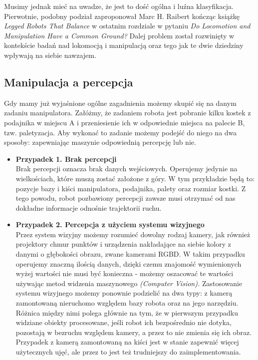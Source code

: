 \documentclass[12pt]{article}
\begin{document}
Musimy jednak mieć na uwadze, że jest to dość ogólna i luźna klasyfikacja. Pierwotnie, podobny podział zaproponował Marc H. Raibert kończąc książkę  \emph{Legged Robots That Balance} w ostatnim rozdziale w pytaniu \emph{Do Locomotion and Manipulation Have a Common Ground?} Dalej problem został rozwinięty w kontekście badań nad lokomocją i manipulacją oraz tego jak te dwie dziedziny wpływają na siebie nawzajem.

\subsection{Manipulacja a percepcja}
Gdy mamy już wyjaśnione ogólne zagadnienia możemy skupić się na danym zadaniu manipulatora. Załóżmy, że zadaniem robota jest pobranie kilku kostek z podajnika w miejscu A i przeniesienie ich w odpowiednie miejsca na palecie B, tzw. paletyzacja. Aby wykonać to zadanie możemy podejść do niego na dwa sposoby: zapewniając maszynie odpowiednią percepcję lub nie. 

\begin{itemize}
\item \textbf{Przypadek 1. Brak percepcji} \\
Brak percepcji oznacza brak danych wejściowych. Operujemy jedynie na wielkościach, które muszą zostać założone z góry. W tym przykładzie będą to: pozycje bazy i kiści manipulatora, podajnika, palety oraz rozmiar kostki. Z tego powodu, robot pozbawiony percepcji zawsze musi otrzymać od nas dokładne informacje odnośnie trajektorii ruchu.

\item \textbf{Przypadek 2. Percepcja z użyciem systemu wizyjnego} \\
Przez system wizyjny możemy rozumieć dowolny rodzaj kamery, jak również projektory chmur punktów i urządzenia nakładające na siebie kolory z danymi o głębokości obrazu, zwane kamerami RGBD. W takim przypadku operujemy znaczną ilością danych, dzięki czemu znajomość wymienionych wyżej wartości nie musi być konieczna - możemy oszacować te wartości używając metod widzenia maszynowego \emph{(Computer Vision).} Zastosowanie systemu wizyjnego możemy ponownie podzielić na dwa typy: z kamerą zamontowaną nieruchomo względem bazy robota oraz na jego narzędziu. Różnica między nimi polega głównie na tym, że w pierwszym przypadku widziane obiekty procesowane, jeśli robot ich bezpośrednio nie dotyka, pozostają w bezruchu względem kamery, a przez to nie zmienia się ich obraz. Przypadek z kamerą zamontowaną na kiści jest w stanie zapewnić więcej użytecznych ujęć, ale przez to jest też trudniejszy do zaimplementowania.
\end{itemize}
\end{document}
